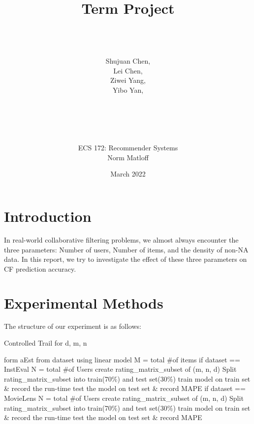 \documentclass[12pt]{article}
\title{Term Project}
\author{\\
\\
\\
Shujuan Chen,\\
Lei Chen,\\
Ziwei Yang,\\
Yibo Yan, \\
\\
\\
\\
\\
\\
ECS 172: Recommender Systems \\ 
Norm Matloff
}
\date{March 2022}
\begin{document}
\maketitle 
\newpage
\tableofcontents
\newpage
\section{Introduction}
In real-world collaborative filtering problems, we almost always encounter the three parameters: Number of users, Number of items, and the density of non-NA data. In this report, we try to investigate the effect of these three parameters on CF prediction accuracy.

\section{Experimental Methods}
The structure of our experiment is as follows:
\newline

\begin{singlespace}
 \begin{algorithm}[H]
	\caption{Controlled Trail for d, m, n} 
	\begin{algorithmic}[1]
		    \State form aEst from dataset using linear model
			    \State M = total \#of items
			    \newline
			    \State if dataset == InstEval
			        \State N = total \#of Users
			            \State create rating\_matrix\_subset of (m, n, d)
			                \State Split rating\_matrix\_subset into train(70\%) and test set(30\%)
			                \State train model on train set \& record the run-time
			                \State test the model on test set \& record MAPE 
			            \EndFor
			         \EndFor
			    \EndFor
			    \newline
			    \State if dataset == MovieLens
			        \State N = total \#of Users
			            \State create rating\_matrix\_subset of (m, n, d)
			                \State Split rating\_matrix\_subset into train(70\%) and test set(30\%)
			                \State train model on train set \& record the run-time
			                \State test the model on test set \& record MAPE 
			            \EndFor
			         \EndFor
			     \EndFor
			 \EndFor
			 \newline
		\EndFor
	\end{algorithmic} 
\end{algorithm}
\end{singlespace}
\end{document}
